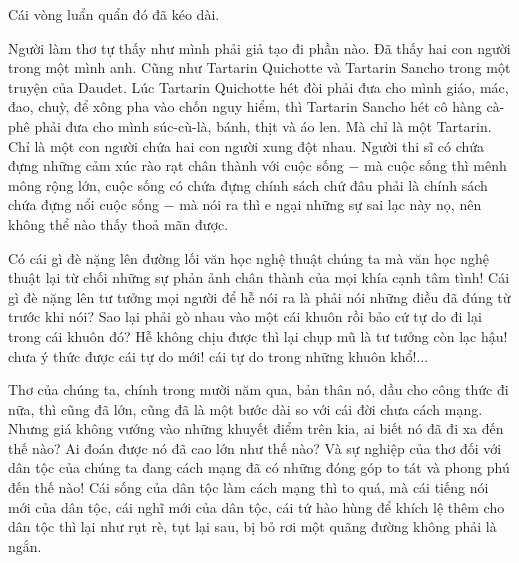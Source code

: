 \documentclass[../main.tex]{subfiles}
\begin{document}
\begin{multicols}{2}
Cái vòng luẩn quẩn đó đã kéo dài.  
 
Người làm thơ tự thấy như mình phải giả tạo đi phần nào. Đã thấy hai con người trong một mình anh. Cũng như Tartarin Quichotte và Tartarin Sancho trong một truyện của Daudet. Lúc Tartarin Quichotte hét đòi phải đưa cho mình giáo, mác, đao, chuỳ, để xông pha vào chốn nguy hiểm, thì Tartarin Sancho hét cô hàng cà-phê phải đưa cho mình súc-cù-là, bánh, thịt và áo len. Mà chỉ là một Tartarin. Chỉ là một con người chứa hai con người xung đột nhau. Người thi sĩ có chứa đựng những cảm xúc rào rạt chân thành với cuộc sống − mà cuộc sống thì mênh mông rộng lớn, cuộc sống có chứa đựng chính sách chứ đâu phải là chính sách chứa đựng nổi cuộc sống − mà nói ra thì e ngại những sự sai lạc này nọ, nên không thể nào thấy thoả mãn được. 
 
Có cái gì đè nặng lên đường lối văn học nghệ thuật chúng ta mà văn học nghệ thuật lại từ chối những sự phản ảnh chân thành của mọi khía cạnh tâm tình! Cái gì đè nặng lên tư tưởng mọi người để hễ nói ra là phải nói những điều đã đúng từ trước khi nói? Sao lại phải gò nhau vào một cái khuôn rồi bảo cứ tự do đi lại trong cái khuôn đó? Hễ không chịu được thì lại chụp mũ là tư tưởng còn lạc hậu! chưa ý thức được cái tự do mới! cái tự do trong những khuôn khổ!...  
 
Thơ của chúng ta, chính trong mười năm qua, bản thân nó, dầu cho công thức đi nữa, thì cũng đã lớn, cũng đã là một bước dài so với cái đời chưa cách mạng. Nhưng giá không vướng vào những khuyết điểm trên kia, ai biết nó đã đi xa đến thế nào? Ai đoán được nó đã cao lớn như thế nào? Và sự nghiệp của thơ đối với dân tộc của chúng ta đang cách mạng đã có những đóng góp to tát và phong phú đến thế nào! Cái sống của dân tộc làm cách mạng thì to quá, mà cái tiếng nói mới của dân tộc, cái nghĩ mới của dân tộc, cái tứ hào hùng để khích lệ thêm cho dân tộc thì lại như rụt rè, tụt lại sau, bị bỏ rơi một quãng đường không phải là ngắn.  
 

\end{multicols}
\end{document}
